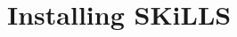 \documentclass[english,11pt]{article}
\begin{document}










\section{Installing SKiLLS}
\end{document}
